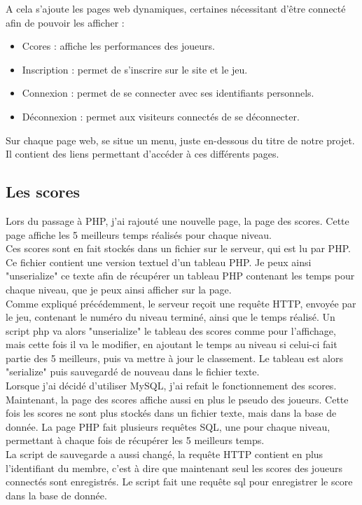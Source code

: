 \documentclass[12pt]{article}
\begin{document}
A cela s'ajoute les pages web dynamiques, certaines nécessitant d'être connecté afin de pouvoir les afficher :

\begin{itemize}
\item Ccores : affiche les performances des joueurs.
\item Inscription : permet de s'inscrire sur le site et le jeu.
\item Connexion : permet de se connecter avec ses identifiants personnels.
\item Déconnexion : permet aux visiteurs connectés de se déconnecter.
\end{itemize}

Sur chaque page web, se situe un menu, juste en-dessous du titre de notre projet. Il contient des liens permettant d'accéder à ces différents pages.

\subsection{Les scores}

Lors du passage à PHP, j'ai rajouté une nouvelle page, la page des scores. Cette page affiche les 5 meilleurs temps réalisés pour chaque niveau.\\
Ces scores sont en fait stockés dans un fichier sur le serveur, qui est lu par PHP. Ce fichier contient une version textuel d'un tableau PHP. Je peux ainsi "unserialize" ce texte afin de récupérer un tableau PHP contenant les temps pour chaque niveau, que je peux ainsi afficher sur la page.\\

Comme expliqué précédemment, le serveur reçoit une requête HTTP, envoyée par le jeu, contenant le numéro du niveau terminé, ainsi que le temps réalisé. Un script php va alors "unserialize" le tableau des scores comme pour l'affichage, mais cette fois il va le modifier, en ajoutant le temps au niveau si celui-ci fait partie des 5 meilleurs, puis va mettre à jour le classement. Le tableau est alors "serialize" puis sauvegardé de nouveau dans le fichier texte.\\

Lorsque j'ai décidé d'utiliser MySQL, j'ai refait le fonctionnement des scores. Maintenant, la page des scores affiche aussi en plus le pseudo des joueurs. Cette fois les scores ne sont plus stockés dans un fichier texte, mais dans la base de donnée. La page PHP fait plusieurs requêtes SQL, une pour chaque niveau, permettant à chaque fois de récupérer les 5 meilleurs temps.\\
La script de sauvegarde a aussi changé, la requête HTTP contient en plus l'identifiant du membre, c'est à dire que maintenant seul les scores des joueurs connectés sont enregistrés. Le script fait une requête sql pour enregistrer le score dans la base de donnée.
\end{document}
